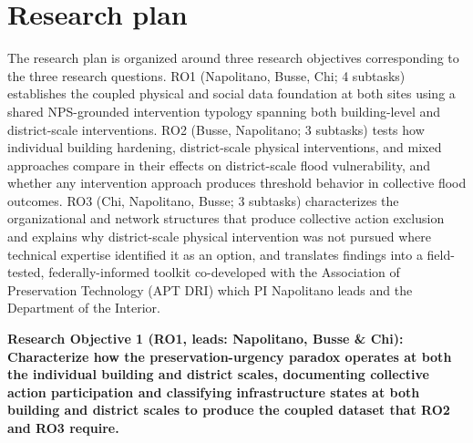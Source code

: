 \documentclass[11pt]{article}
\begin{document}
\section{Research plan}
The research plan is organized around three research objectives corresponding to the
three research questions.
RO1 (Napolitano, Busse, Chi; 4 subtasks) establishes the coupled physical and social
data foundation at both sites using a shared NPS-grounded intervention typology spanning
both building-level and district-scale interventions.
RO2 (Busse, Napolitano; 3 subtasks) tests how individual building hardening,
district-scale physical interventions, and mixed approaches compare in their effects
on district-scale flood vulnerability, and whether any intervention approach produces
threshold behavior in collective flood outcomes.
RO3 (Chi, Napolitano, Busse; 3 subtasks) characterizes the organizational and network
structures that produce collective action exclusion and explains why district-scale
physical intervention was not pursued where technical expertise identified it as an
option, and translates findings into a field-tested, federally-informed toolkit
co-developed with the Association of Preservation Technology (APT DRI) which PI
Napolitano leads and the Department of the Interior.

\begin{tcolorbox}[colback=roonecol!60,colframe=black,boxrule=1pt,coltext=black,
  left=1mm,right=1mm,top=1mm,bottom=1mm]
\textbf{Research Objective 1 (RO1, leads: Napolitano, Busse \& Chi): Characterize
how the preservation-urgency paradox operates at both the individual building and
district scales, documenting collective action participation and classifying
infrastructure states at both building and district scales to produce the coupled
dataset that RO2 and RO3 require.}
\end{tcolorbox}
\end{document}
